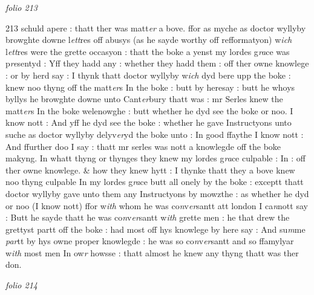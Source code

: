 \documentclass[12pt, a4paper]{book}
\begin{document}
\dotfill
					

\textit{folio 213}


{\color{Mahogany}213} schuld apere : thatt ther was matt\textit{er} a bove. ffor as myche as doctor wyllyby browghte downe l\textit{ett}res off abusys (as he sayde worthy off refformatyon) w\textit{ich} l\textit{ett}res were the grette occasyon : thatt the boke a yenst my lordes g\textit{ra}ce was p\textit{re}sentyd : Yff they hadd any : whether they hadd them : off ther owne knowlege : or by herd say : I thynk thatt doctor wyllyby w\textit{ich} dyd bere upp the boke : knew noo thyng off the matt\textit{er}s In the boke : butt by heresay : butt he whoys byllys he browghte downe unto Cant\textit{er}bury thatt was : mr Serles knew the matt\textit{er}s In the boke welenowghe : butt whether he dyd see the boke or noo. I know nott : And yff he dyd see the boke : whether he gave Instructyons unto suche as doctor wyllyby delyv\textit{er}yd the  boke unto : In good ffaythe I know nott : And ffurther doo I say : thatt mr serles was nott a knowlegde off the boke makyng.  In whatt thyng or thynges they knew my lordes g\textit{ra}ce culpable : In : off ther owne knowlege. \& how they knew hytt : I thynke thatt they a bove knew noo thyng culpable In my lordes g\textit{ra}ce butt all onely by the boke : exceptt thatt doctor wyllyby gave unto them any Instructyons by mowzthe : as whether he dyd or noo (I  know nott) ffor w\textit{ith} whom he was co\textit{n}v\textit{er}santt att london I ca\textit{n}nott say : Butt he sayde thatt he was co\textit{n}v\textit{er}santt w\textit{ith} grette men : he that drew the grettyst partt off the boke : had most off hys knowlege by here say : And su\textit{m}me \textit{par}tt by hys owne proper knowlegde : he was so co\textit{n}v\textit{er}santt and so ffamylyar w\textit{ith} most men In ow\textit{r} howsse : thatt almost he knew any thyng thatt was ther 
			don.

\dotfill
					

\textit{folio 214}
\end{document}

